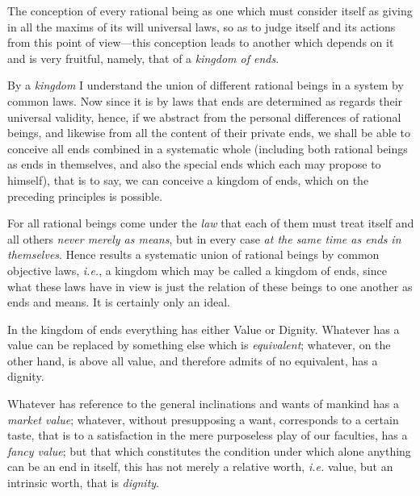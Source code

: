 \snip

The conception of every rational being as one which must
consider itself as giving in all the maxims of its will universal
laws, so as to judge itself and its actions from this point of
view---this conception leads to another which depends on it and is
very fruitful, namely, that of a \textit{kingdom of ends}.

By a \textit{kingdom} I understand the union of different rational
beings in a system by common laws. Now since it is by laws that ends
are determined as regards their universal validity, hence, if we
abstract from the personal differences of rational beings, and
likewise from all the content of their private ends, we shall be able
to conceive all ends combined in a systematic whole (including both
rational beings as ends in themselves, and also the special ends which
each may propose to himself), that is to say, we can conceive a
kingdom of ends, which on the preceding principles is possible.

For all rational beings come under the \textit{law} that each
of them must treat itself and all others \textit{never merely as
means}, but in every case \textit{at the same time as ends in
themselves}. Hence results a systematic union of rational beings by
common objective laws, \textit{i.e.}, a kingdom which may be called a
kingdom of ends, since what these laws have in view is just the
relation of these beings to one another as ends and means. It is
certainly only an ideal.

\snip

In the kingdom of ends everything has either Value or
Dignity. Whatever has a value can be replaced by something else which
is \textit{equivalent}; whatever, on the other hand, is above all
value, and therefore admits of no equivalent, has a dignity.

Whatever has reference to the general inclinations and wants of
mankind has a \textit{market value}; whatever, without presupposing a
want, corresponds to a certain taste, that is to a satisfaction in the
mere purposeless play of our faculties, has a \textit{fancy value};
but that which constitutes the condition under which alone anything
can be an end in itself, this has not merely a relative worth,
\textit{i.e.} value, but an intrinsic worth, that is \textit{dignity}.

